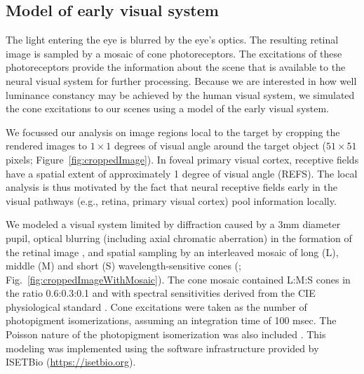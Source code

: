 \documentclass{jov}
\begin{document}
\subsection{Model of early visual system} \label{method:Isetbio}
The light entering the eye is blurred by the eye's optics.
The resulting retinal image is sampled by a mosaic of cone photoreceptors.
The excitations of these photoreceptors provide the information about the scene that is available to the neural visual system for further processing.
Because we are interested in how well luminance constancy may be achieved by the human visual system, we simulated the cone excitations
to our scenes using a model of the early visual system.

We focussed our analysis on image regions local to the target by cropping the rendered images to $1 \times 1$ degrees of visual angle around the target object ($51 \times 51$ pixels; Figure~\ref{fig:croppedImage}). In foveal primary visual cortex, receptive fields have a spatial extent of approximately 1 degree of visual angle (REFS). 
The local analysis is thus motivated by the fact that neural receptive fields early in the visual pathways (e.g., retina, primary visual cortex) pool information locally.

We modeled a visual system limited by diffraction caused by a 3mm diameter pupil, optical blurring (including axial chromatic aberration) in the formation of the retinal image \cite{marimont1994matching}, and spatial sampling by an interleaved mosaic of long (L), middle (M)  and short (S) wavelength-sensitive cones (; Fig.~\ref{fig:croppedImageWithMosaic}). 
The cone mosaic contained L:M:S cones in the ratio 0.6:0.3:0.1 and with spectral sensitivities derived from the CIE physiological standard \cite{CIE86}.
Cone excitations were taken as the number of photopigment isomerizations, assuming an integration time of 100 msec. The Poisson nature of the photopigment isomerization was also included \cite{hecht1942energy}. 
This modeling was implemented using the software infrastructure provided by ISETBio (\href{https://isetbio.org}{https://isetbio.org}).
\end{document}
